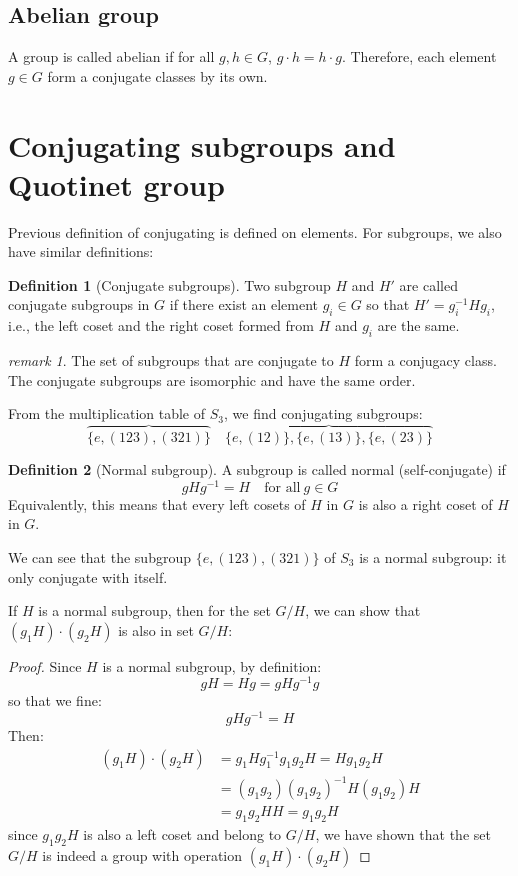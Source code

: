 \documentclass{amsart}
\theoremstyle{remark}
\newtheorem*{remark}{remark}
\theoremstyle{remark}
\theoremstyle{definition}
\newtheorem*{definition}{Definition}
\begin{document}
\subsection*{Abelian group}
A group is called abelian if for all $g, h \in G$, $g\cdot h = h \cdot g$. 
Therefore, each element $g\in G$ form a conjugate classes by its own.

\vspace{10pt}
\section*{Conjugating subgroups and Quotinet group}

Previous definition of conjugating is defined on elements. For subgroups, we also have similar definitions:
\begin{definition}
    [Conjugate subgroups]
    Two subgroup $H$ and $H'$ are called conjugate subgroups in $G$ if there exist an element $g_i\in G$
    so that $H' = g_i^{-1}Hg_i$, i.e., the left coset and the right coset formed from $H$ and $g_i$ are the same. 
\end{definition}
\begin{remark}
    The set of subgroups that are conjugate to $H$ form a conjugacy class. 
    The conjugate subgroups are isomorphic and have the same order.
\end{remark}
From the multiplication table of $S_3$, we find conjugating subgroups:
\begin{equation*}
    \overbrace{\{e, (123), (321)\}}\quad \overbrace{\{e, (12)\},\{e, (13)\},\{e, (23)\}}
\end{equation*}

\begin{definition}
    [Normal subgroup]
    A subgroup is called normal (self-conjugate) if 
    \[
        gHg^{-1} = H\quad \text{for all}\ g \in G 
    \]
    Equivalently, this means that every left cosets of $H$ in $G$ is also a right coset of $H$ in $G$.
\end{definition}
We can see that the subgroup $\{e, (123), (321)\}$ of $S_3$ is a normal subgroup: it only conjugate with itself.

If $H$ is a normal subgroup, then for the set $G/H$, we can show that $(g_1 H)\cdot(g_2 H)$ is also in 
set $G/H$:
\begin{proof}
    Since $H$ is a normal subgroup, by definition: 
    \[gH = Hg = gHg^{-1}g\] so that we fine:
    \[gHg^{-1} = H\]
    Then:
    \begin{align*}
        (g_1 H)\cdot(g_2 H) &= g_1 H g_1^{-1}g_1 g_2 H = H g_1 g_2 H \\
            &= (g_1g_2)(g_1g_2)^{-1} H (g_1g_2) H \\
            &= g_1g_2 H H = g_1 g_2 H 
    \end{align*}
    since $g_1 g_2 H$ is also a left coset and belong to $G/H$, we have shown that the set $G/H$ is indeed a group with 
    operation $(g_1 H)\cdot(g_2 H)$
\end{proof}
\end{document}
